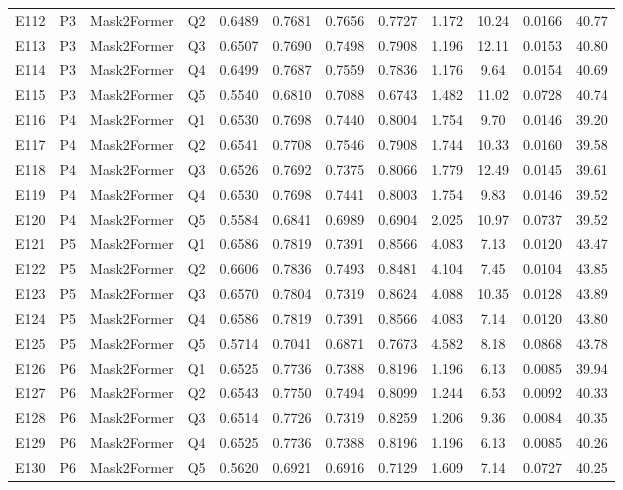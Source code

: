 \begin{longtable}{@{}lllllccccccc@{}}
E112 & P3 & Mask2Former & Q2 & 0.6489 & 0.7681 & 0.7656 & 0.7727 & 1.172 & 10.24 & 0.0166 & 40.77 \\
E113 & P3 & Mask2Former & Q3 & 0.6507 & 0.7690 & 0.7498 & 0.7908 & 1.196 & 12.11 & 0.0153 & 40.80 \\
E114 & P3 & Mask2Former & Q4 & 0.6499 & 0.7687 & 0.7559 & 0.7836 & 1.176 & 9.64 & 0.0154 & 40.69 \\
E115 & P3 & Mask2Former & Q5 & 0.5540 & 0.6810 & 0.7088 & 0.6743 & 1.482 & 11.02 & 0.0728 & 40.74 \\
E116 & P4 & Mask2Former & Q1 & 0.6530 & 0.7698 & 0.7440 & 0.8004 & 1.754 & 9.70 & 0.0146 & 39.20 \\
E117 & P4 & Mask2Former & Q2 & 0.6541 & 0.7708 & 0.7546 & 0.7908 & 1.744 & 10.33 & 0.0160 & 39.58 \\
E118 & P4 & Mask2Former & Q3 & 0.6526 & 0.7692 & 0.7375 & 0.8066 & 1.779 & 12.49 & 0.0145 & 39.61 \\
E119 & P4 & Mask2Former & Q4 & 0.6530 & 0.7698 & 0.7441 & 0.8003 & 1.754 & 9.83 & 0.0146 & 39.52 \\
E120 & P4 & Mask2Former & Q5 & 0.5584 & 0.6841 & 0.6989 & 0.6904 & 2.025 & 10.97 & 0.0737 & 39.52 \\
E121 & P5 & Mask2Former & Q1 & 0.6586 & 0.7819 & 0.7391 & 0.8566 & 4.083 & 7.13 & 0.0120 & 43.47 \\
E122 & P5 & Mask2Former & Q2 & 0.6606 & 0.7836 & 0.7493 & 0.8481 & 4.104 & 7.45 & 0.0104 & 43.85 \\
E123 & P5 & Mask2Former & Q3 & 0.6570 & 0.7804 & 0.7319 & 0.8624 & 4.088 & 10.35 & 0.0128 & 43.89 \\
E124 & P5 & Mask2Former & Q4 & 0.6586 & 0.7819 & 0.7391 & 0.8566 & 4.083 & 7.14 & 0.0120 & 43.80 \\
E125 & P5 & Mask2Former & Q5 & 0.5714 & 0.7041 & 0.6871 & 0.7673 & 4.582 & 8.18 & 0.0868 & 43.78 \\
E126 & P6 & Mask2Former & Q1 & 0.6525 & 0.7736 & 0.7388 & 0.8196 & 1.196 & 6.13 & 0.0085 & 39.94 \\
E127 & P6 & Mask2Former & Q2 & 0.6543 & 0.7750 & 0.7494 & 0.8099 & 1.244 & 6.53 & 0.0092 & 40.33 \\
E128 & P6 & Mask2Former & Q3 & 0.6514 & 0.7726 & 0.7319 & 0.8259 & 1.206 & 9.36 & 0.0084 & 40.35 \\
E129 & P6 & Mask2Former & Q4 & 0.6525 & 0.7736 & 0.7388 & 0.8196 & 1.196 & 6.13 & 0.0085 & 40.26 \\
E130 & P6 & Mask2Former & Q5 & 0.5620 & 0.6921 & 0.6916 & 0.7129 & 1.609 & 7.14 & 0.0727 & 40.25 \\

\end{longtable}
